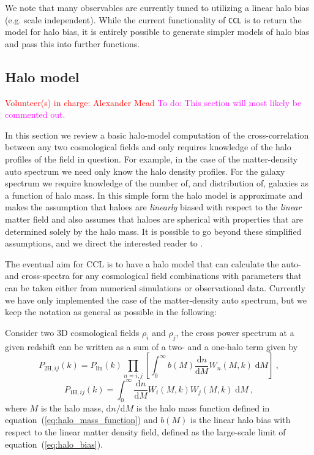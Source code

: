 \documentclass[\docopts]{\docclass}
\newcommand{\todo}[1]{\textcolor{magenta}{To do: #1}}
\newcommand{\vol}[1]{\textcolor{red}{Volunteer(s) in charge: #1}}
\begin{document}
We note that many observables are currently tuned to utilizing a linear halo bias (e.g. scale independent). While the current functionality of {\tt CCL} is to return the \citet{Tinker2010} model for halo bias, it is entirely possible to generate simpler models of halo bias and pass this into further functions.

\subsection{Halo model}
\label{sec:halo_model}
\vol{Alexander Mead}
\todo{This section will most likely be commented out.}

In this section we review a basic halo-model computation \citep{Seljak2000,Peacock2000,Cooray2002} of the cross-correlation between any two cosmological fields and only requires knowledge of the halo profiles of the field in question. For example, in the case of the matter-density auto spectrum we need only know the halo density profiles. For the galaxy spectrum we require knowledge of the number of, and distribution of, galaxies as a function of halo mass. In this simple form the halo model is approximate and makes the assumption that haloes are \emph{linearly} biased with respect to the \emph{linear} matter field and also assumes that haloes are spherical with properties that are determined solely by the halo mass. It is possible to go beyond these simplified assumptions, and we direct the interested reader to \cite{Cooray2002,Smith2007,Giocoli2010,Smith2011}.

The eventual aim for CCL is to have a halo model that can calculate the auto- and cross-spectra for any cosmological field combinations with parameters that can be taken either from numerical simulations or observational data. Currently we have only implemented the case of the matter-density auto spectrum, but we keep the notation as general as possible in the following:

Consider two 3D cosmological fields $\rho_i$ and $\rho_j$, the cross power spectrum at a given redshift can be written as a sum of a two- and a one-halo term given by
\begin{equation}
P_{2\mathrm{H},ij}(k)=P_{\mathrm{lin}}(k)
\prod_{n=i,j}\left[\int_0^\infty b(M)\frac{\mathrm{d}n}{\mathrm{d}M}W_n(M,k)\;\mathrm{d}M\right]\ ,
\label{eq:two_halo}
\end{equation}
\begin{equation}
P_{1\mathrm{H},ij}(k)=\int_0^\infty \frac{\mathrm{d}n}{\mathrm{d}M}W_i(M,k)W_j(M,k)\;\mathrm{d}M\ ,
\label{eq:one_halo}
\end{equation}
where $M$ is the halo mass, $\mathrm{d}n/\mathrm{d}M$ is the halo mass function defined in equation~(\ref{eq:halo_mass_function}) and $b(M)$ is the linear halo bias with respect to the linear matter density field, defined as the large-scale limit of equation~(\ref{eq:halo_bias}).
\end{document}
